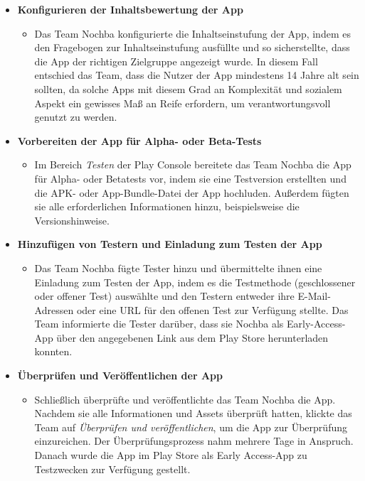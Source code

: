 \begin{itemize}
\begin{itemize}
          \end{itemize}
    \item \textbf{Konfigurieren der Inhaltsbewertung der App}
          \begin{itemize}
              \item {Das Team Nochba konfigurierte die Inhaltseinstufung der App, indem es den Fragebogen zur Inhaltseinstufung ausfüllte und so sicherstellte, dass die App der richtigen Zielgruppe angezeigt wurde. In diesem Fall entschied das Team, dass die Nutzer der App mindestens 14 Jahre alt sein sollten, da solche Apps mit diesem Grad an Komplexität und sozialem Aspekt ein gewisses Maß an Reife erfordern, um verantwortungsvoll genutzt zu werden.}
          \end{itemize}
    \item \textbf{Vorbereiten der App für Alpha- oder Beta-Tests}
          \begin{itemize}
              \item {Im Bereich \textit{Testen} der Play Console bereitete das Team Nochba die App für Alpha- oder Betatests vor, indem sie eine Testversion erstellten und die APK- oder App-Bundle-Datei der App hochluden. Außerdem fügten sie alle erforderlichen Informationen hinzu, beispielsweise die Versionshinweise.}
          \end{itemize}
    \item \textbf{Hinzufügen von Testern und Einladung zum Testen der App}
          \begin{itemize}
              \item {Das Team Nochba fügte Tester hinzu und übermittelte ihnen eine Einladung zum Testen der App, indem es die Testmethode (geschlossener oder offener Test) auswählte und den Testern entweder ihre E-Mail-Adressen oder eine URL für den offenen Test zur Verfügung stellte. Das Team informierte die Tester darüber, dass sie Nochba als Early-Access-App über den angegebenen Link aus dem Play Store herunterladen konnten.}
          \end{itemize}
    \item \textbf{Überprüfen und Veröffentlichen der App}
          \begin{itemize}
              \item {Schließlich überprüfte und veröffentlichte das Team Nochba die App. Nachdem sie alle Informationen und Assets überprüft hatten, klickte das Team auf \textit{Überprüfen und veröffentlichen}, um die App zur Überprüfung einzureichen. Der Überprüfungsprozess nahm mehrere Tage in Anspruch. Danach wurde die App im Play Store als Early Access-App zu Testzwecken zur Verfügung gestellt.}
          \end{itemize}
\end{itemize}

